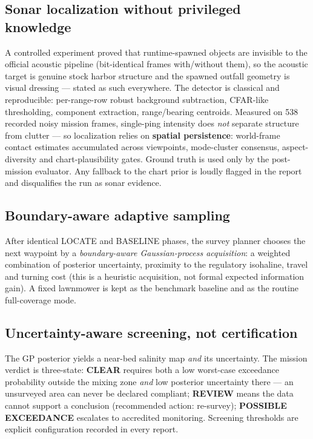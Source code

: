 \documentclass[10pt,a4paper]{article}
\begin{document}
\subsection{Sonar localization without privileged knowledge}
A controlled experiment proved that runtime-spawned objects are invisible to
the official acoustic pipeline (bit-identical frames with/without them), so
the acoustic target is genuine stock harbor structure and the spawned
outfall geometry is visual dressing — stated as such everywhere. The
detector is classical and reproducible: per-range-row robust background
subtraction, CFAR-like thresholding, component extraction, range/bearing
centroids. Measured on 538 recorded noisy mission frames, single-ping
intensity does \emph{not} separate structure from clutter — so localization
relies on \textbf{spatial persistence}: world-frame contact estimates
accumulated across viewpoints, mode-cluster consensus, aspect-diversity and
chart-plausibility gates. Ground truth is used only by the post-mission
evaluator. Any fallback to the chart prior is loudly flagged in the report
and disqualifies the run as sonar evidence.

\subsection{Boundary-aware adaptive sampling}
After identical LOCATE and BASELINE phases, the survey planner chooses the
next waypoint by a \emph{boundary-aware Gaussian-process acquisition}: a
weighted combination of posterior uncertainty, proximity to the regulatory
isohaline, travel and turning cost (this is a heuristic acquisition, not
formal expected information gain). A fixed lawnmower is kept as the
benchmark baseline and as the routine full-coverage mode.

\subsection{Uncertainty-aware screening, not certification}
The GP posterior yields a near-bed salinity map \emph{and} its uncertainty.
The mission verdict is three-state:
{\color{okgreen}\textbf{CLEAR}} requires both a low worst-case exceedance
probability outside the mixing zone \emph{and} low posterior uncertainty
there — an unsurveyed area can never be declared compliant;
{\color{amber}\textbf{REVIEW}} means the data cannot support a conclusion
(recommended action: re-survey); {\color{warnred}\textbf{POSSIBLE
EXCEEDANCE}} escalates to accredited monitoring. Screening thresholds are
explicit configuration recorded in every report.
\end{document}
